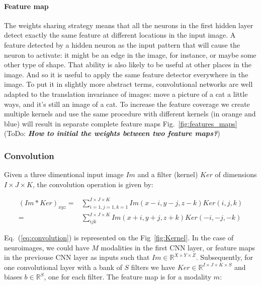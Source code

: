 \documentclass[final, paper=letter,5p,times,twocolumn]{elsarticle}
\newcommand{\ToDo}[1]{ToDo: \textbf{\textit{#1}}}
\begin{document}
\paragraph{Feature map}{The weights sharing strategy means that all the neurons in the first hidden layer detect exactly the same feature at different locations in the input image. A feature detected by a hidden neuron as the input pattern that will cause the neuron to activate: it might be an edge in the image, for instance, or maybe some other type of shape. That ability is also likely to be useful at other places in the image. And so it is useful to apply the same feature detector everywhere in the image. To put it in slightly more abstract terms, convolutional networks are well adapted to the translation invariance of images: move a picture of a cat a little ways, and it's still an image of a cat. To increase the feature coverage we create multiple kernels and use the same procedure with different kernels (in orange and blue) will result in separate complete feature maps Fig.~\ref{fig:features_maps} (\ToDo{How to initial the weights between two feature maps?})}

\subsubsection{Convolution}

Given a three dimentional input image $Im$ and a filter (kernel) $Ker$ of dimensions $I \times J \times K$, the convolution operation is given by:

\begin{equation}
  \begin{split}
    (Im*Ker)_{xyz} = & \sum_{i=1,j=1,k=1}^{I \times J \times K} Im(x-i,y-j,z-k)Ker(i,j,k)\\
    = & \sum_{ijk}^{I \times J \times K} Im(x+i,y+j,z+k)Ker(-i,-j,-k)
  \end{split}
  \label{eq:convolution} 
\end{equation}

Eq.~(\ref{eq:convolution}) is represented on the Fig~\ref{fig:Kernel}. In the case of neuroimages, we could have $M$ modalities in the first CNN layer, or feature maps in the previouse CNN layer as inputs such that $Im \in \mathbb{R}^{X \times Y \times Z}$. Subsequently, for one convolutional layer with a bank of $S$ filters we have $Ker \in \mathbb{R}^{I \times J \times K \times S}$ and biases $b \in \mathbb{R}^{S}$, one for each filter. The feature map is for a modality $m$:
\end{document}
